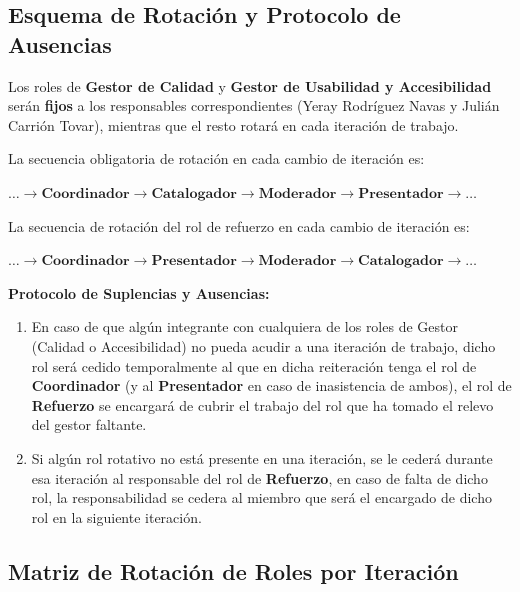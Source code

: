 \subsection{Esquema de Rotación y Protocolo de Ausencias}
Los roles de \textbf{Gestor de Calidad} y \textbf{Gestor de Usabilidad y Accesibilidad} serán \textbf{fijos} a los responsables correspondientes (Yeray Rodríguez Navas y Julián Carrión Tovar), mientras que el resto rotará en cada iteración de trabajo.

\begin{infobox}[title=Regla de Rotación Cíclica]
La secuencia obligatoria de rotación en cada cambio de iteración es:\\
\centerline{\large $\dots \longrightarrow \textbf{Coordinador} \longrightarrow \textbf{Catalogador} \longrightarrow \textbf{Moderador} \longrightarrow \textbf{Presentador} \longrightarrow \dots$}
\end{infobox}

\begin{infobox}[title=Regla de Rotación Cíclica Inversa para Rol de Refuerzo]
La secuencia de rotación del rol de refuerzo en cada cambio de iteración es:\\
\centerline{\large $\dots \longrightarrow \textbf{Coordinador} \longrightarrow \textbf{Presentador} \longrightarrow \textbf{Moderador} \longrightarrow \textbf{Catalogador} \longrightarrow \dots$}
\end{infobox}

\noindent\textbf{Protocolo de Suplencias y Ausencias:}
\begin{enumerate}[leftmargin=*]
  \item En caso de que algún integrante con cualquiera de los roles de Gestor (Calidad o Accesibilidad) no pueda acudir a una iteración de trabajo, dicho rol será cedido temporalmente al que en dicha reiteración tenga el rol de \textbf{Coordinador} (y al \textbf{Presentador} en caso de inasistencia de ambos), el rol de \textbf{Refuerzo} se encargará de cubrir el trabajo del rol que ha tomado el relevo del gestor faltante.
  \item Si algún rol rotativo no está presente en una iteración, se le cederá durante esa iteración al responsable del rol de \textbf{Refuerzo}, en caso de falta de dicho rol, la responsabilidad se cedera al miembro que será el encargado de dicho rol en la siguiente iteración.
\end{enumerate}

\subsection{Matriz de Rotación de Roles por Iteración}

